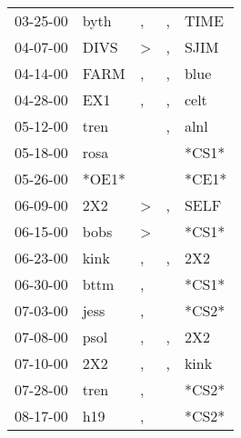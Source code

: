 \begin{supertabular}{p{0.07\textwidth}p{0.06\textwidth}p{0.02\textwidth}p{0.02\textwidth}p{0.06\textwidth}}
 03-25-00\textsuperscript{} &  byth\textsuperscript{} &                , &             , &           TIME\textsuperscript{} \\
 04-07-00\textsuperscript{} &  DIVS\textsuperscript{} &     \textgreater &             , &           SJIM\textsuperscript{} \\
 04-14-00\textsuperscript{} &  FARM\textsuperscript{} &                , &             , &           blue\textsuperscript{} \\
 04-28-00\textsuperscript{} &   EX1\textsuperscript{} &                , &             , &           celt\textsuperscript{} \\
 05-12-00\textsuperscript{} &  tren\textsuperscript{} &                  &             , &           alnl\textsuperscript{} \\
 05-18-00\textsuperscript{} &  rosa\textsuperscript{} &                  &               &                            *CS1* \\
 05-26-00\textsuperscript{} &                   *OE1* &                  &               &                            *CE1* \\
 06-09-00\textsuperscript{} &   2X2\textsuperscript{} &     \textgreater &             , &           SELF\textsuperscript{} \\
 06-15-00\textsuperscript{} &  bobs\textsuperscript{} &     \textgreater &               &                            *CS1* \\
 06-23-00\textsuperscript{} &  kink\textsuperscript{} &                , &             , &            2X2\textsuperscript{} \\
 06-30-00\textsuperscript{} &  bttm\textsuperscript{} &                , &               &                            *CS1* \\
 07-03-00\textsuperscript{} &  jess\textsuperscript{} &                , &               &                            *CS2* \\
 07-08-00\textsuperscript{} &  psol\textsuperscript{} &                , &             , &            2X2\textsuperscript{} \\
 07-10-00\textsuperscript{} &   2X2\textsuperscript{} &                , &             , &           kink\textsuperscript{} \\
 07-28-00\textsuperscript{} &  tren\textsuperscript{} &                , &               &                            *CS2* \\
 08-17-00\textsuperscript{} &   h19\textsuperscript{} &                , &               &                            *CS2* \\

\end{supertabular}
